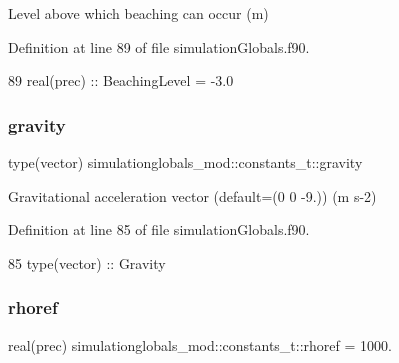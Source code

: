 Level above which beaching can occur (m) 



Definition at line 89 of file simulation\+Globals.\+f90.


\begin{DoxyCode}
89         \textcolor{keywordtype}{real(prec)}   :: BeachingLevel = -3.0
\end{DoxyCode}
\mbox{\label{structsimulationglobals__mod_1_1constants__t_abe210fea4268af42f1cb950a1e3b3cfd}} 
\subsubsection{\texorpdfstring{gravity}{gravity}}
{\footnotesize\ttfamily type(vector) simulationglobals\+\_\+mod\+::constants\+\_\+t\+::gravity\hspace{0.3cm}{\ttfamily [private]}}



Gravitational acceleration vector (default=(0 0 -\/9.)) (m s-\/2) 



Definition at line 85 of file simulation\+Globals.\+f90.


\begin{DoxyCode}
85         \textcolor{keywordtype}{type}(vector) :: Gravity
\end{DoxyCode}
\mbox{\label{structsimulationglobals__mod_1_1constants__t_ac95f74b07cc46e86d443d4dd666235c3}} 
\subsubsection{\texorpdfstring{rhoref}{rhoref}}
{\footnotesize\ttfamily real(prec) simulationglobals\+\_\+mod\+::constants\+\_\+t\+::rhoref = 1000.\hspace{0.3cm}{\ttfamily [private]}}



